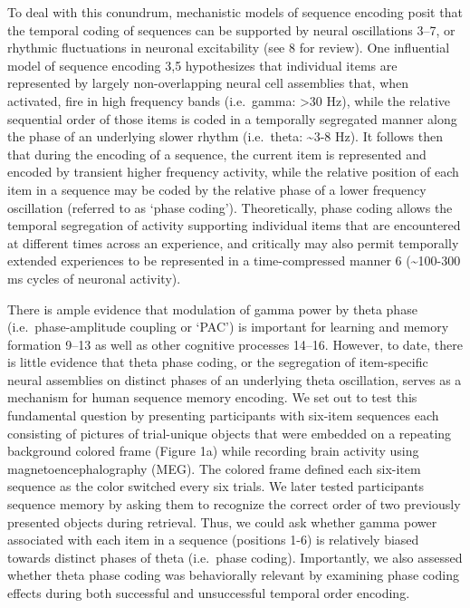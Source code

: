 To deal with this conundrum, mechanistic models of sequence encoding
posit that the temporal coding of sequences can be supported by neural
oscillations 3--7, or rhythmic fluctuations in neuronal excitability
(see 8 for review). One influential model of sequence encoding 3,5
hypothesizes that individual items are represented by largely
non-overlapping neural cell assemblies that, when activated, fire in
high frequency bands (i.e.~gamma: \textgreater{}30 Hz), while the
relative sequential order of those items is coded in a temporally
segregated manner along the phase of an underlying slower rhythm
(i.e.~theta: \textasciitilde{}3-8 Hz). It follows then that during the
encoding of a sequence, the current item is represented and encoded by
transient higher frequency activity, while the relative position of each
item in a sequence may be coded by the relative phase of a lower
frequency oscillation (referred to as `phase coding'). Theoretically,
phase coding allows the temporal segregation of activity supporting
individual items that are encountered at different times across an
experience, and critically may also permit temporally extended
experiences to be represented in a time-compressed manner 6
(\textasciitilde{}100-300 ms cycles of neuronal activity).

There is ample evidence that modulation of gamma power by theta phase
(i.e.~phase-amplitude coupling or `PAC') is important for learning and
memory formation 9--13 as well as other cognitive processes 14--16.
However, to date, there is little evidence that theta phase coding, or
the segregation of item-specific neural assemblies on distinct phases of
an underlying theta oscillation, serves as a mechanism for human
sequence memory encoding. We set out to test this fundamental question
by presenting participants with six-item sequences each consisting of
pictures of trial-unique objects that were embedded on a repeating
background colored frame (Figure 1a) while recording brain activity
using magnetoencephalography (MEG). The colored frame defined each
six-item sequence as the color switched every six trials. We later
tested participants sequence memory by asking them to recognize the
correct order of two previously presented objects during retrieval.
Thus, we could ask whether gamma power associated with each item in a
sequence (positions 1-6) is relatively biased towards distinct phases of
theta (i.e.~phase coding). Importantly, we also assessed whether theta
phase coding was behaviorally relevant by examining phase coding effects
during both successful and unsuccessful temporal order encoding.

